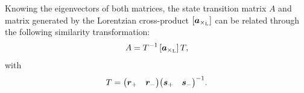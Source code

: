 Knowing the eigenvectors of both matrices, the state transition matrix \(A\) and matrix generated by the Lorentzian cross-product \([\vec{a}_{\lorcrossp{}{}}]\) can be related through the following similarity transformation:
\begin{equation}
     A = T^{-1}\,[\vec{a}_{\lorcrossp{}{}}]\,T,
\end{equation}
with 
\begin{equation}
     T = \mqty(\vec{r}_+ & \vec{r}_-) \mqty(\vec{s}_+ & \vec{s}_-)^{-1}.
\end{equation}

